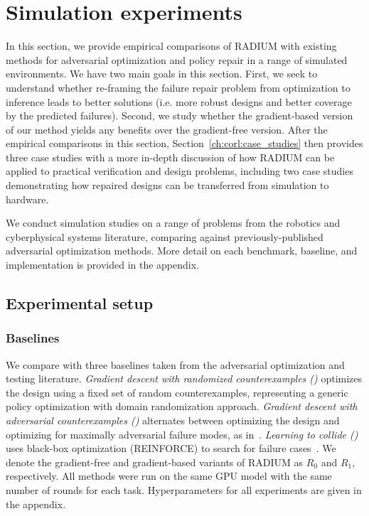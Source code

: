 \section{Simulation experiments}\label{ch:corl:experiments}

In this section, we provide empirical comparisons of RADIUM with existing methods for adversarial optimization and policy repair in a range of simulated environments. We have two main goals in this section. First, we seek to understand whether re-framing the failure repair problem from optimization to inference leads to better solutions (i.e. more robust designs and better coverage by the predicted failures). Second, we study whether the gradient-based version of our method yields any benefits over the gradient-free version. After the empirical comparisons in this section, Section~\ref{ch:corl:case_studies} then provides three case studies with a more in-depth discussion of how RADIUM can be applied to practical verification and design problems, including two case studies demonstrating how repaired designs can be transferred from simulation to hardware.

We conduct simulation studies on a range of problems from the robotics and cyberphysical systems literature, comparing against previously-published adversarial optimization methods. More detail on each benchmark, baseline, and implementation is provided in the appendix.

\subsection{Experimental setup}

\subsubsection{Baselines}

We compare with three baselines taken from the adversarial optimization and testing literature.
%
\textit{Gradient descent with randomized counterexamples (\gdr)} optimizes the design using a fixed set of random counterexamples, representing a generic policy optimization with domain randomization approach.
%
\textit{Gradient descent with adversarial counterexamples (\gda)} alternates between optimizing the design and optimizing for maximally adversarial failure modes, as in~\cite{hanselmannKINGGeneratingSafetyCritical2022a,dawsonRobustCounterexampleguidedOptimization2022b}.
%
\textit{Learning to collide (\ltc)} uses black-box optimization (REINFORCE) to search for failure cases~\cite{dingLearningCollideAdaptive2020a}.
%
We denote the gradient-free and gradient-based variants of RADIUM as $R_0$ and $R_1$, respectively.
%
All methods were run on the same GPU model with the same number of rounds for each task. Hyperparameters for all experiments are given in the appendix.

